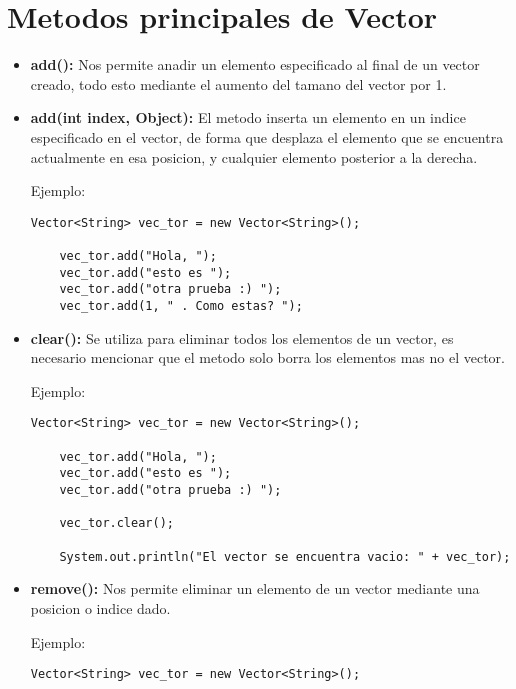 \documentclass[12pt, letterpaper]{article} %
\begin{document}
\section*{Metodos principales de Vector}
\begin{itemize}
    \item \textbf{add():} Nos permite anadir un elemento especificado al final de un vector creado, todo esto mediante el aumento del tamano del vector por 1.

    \item \textbf{add(int index, Object):} El metodo inserta un elemento en un indice especificado en el vector, de forma que desplaza el elemento que se encuentra actualmente en esa posicion, y cualquier elemento posterior a la derecha.

    Ejemplo:
    \lstset{language = Java, breaklines=true, basicstyle=\footnotesize}
    \begin{lstlisting}[frame=single]
    Vector<String> vec_tor = new Vector<String>();

    vec_tor.add("Hola, ");
    vec_tor.add("esto es ");
    vec_tor.add("otra prueba :) ");
    vec_tor.add(1, " . Como estas? ");
    \end{lstlisting}

    \item \textbf{clear():} Se utiliza para eliminar todos los elementos de un vector, es necesario mencionar que el metodo solo borra los elementos mas no el vector.

    Ejemplo:
    \lstset{language = Java, breaklines=true, basicstyle=\footnotesize}
    \begin{lstlisting}[frame=single]
    Vector<String> vec_tor = new Vector<String>();

    vec_tor.add("Hola, ");
    vec_tor.add("esto es ");
    vec_tor.add("otra prueba :) ");

    vec_tor.clear();

    System.out.println("El vector se encuentra vacio: " + vec_tor);
    \end{lstlisting}

    \item \textbf{remove():} Nos permite eliminar un elemento de un vector mediante una posicion o indice dado.

    Ejemplo:
    \lstset{language = Java, breaklines=true, basicstyle=\footnotesize}
    \begin{lstlisting}[frame=single]
    Vector<String> vec_tor = new Vector<String>();


\end{lstlisting}
\end{itemize}
\end{document}
